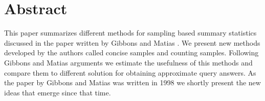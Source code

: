 
\section{Abstract}

This paper summarizes different methods for sampling based summary
statistics discussed in the paper written by Gibbons and Matias
\cite{GM98}. We present new methods developed by the authors called
concise samples and counting samples. Following Gibbons and Matias
arguments we estimate the usefulness of
this methods and compare them to different solution for obtaining
approximate query answers. As the paper by Gibbons and Matias was
written in 1998 we shortly present the new ideas that emerge since
that time.
